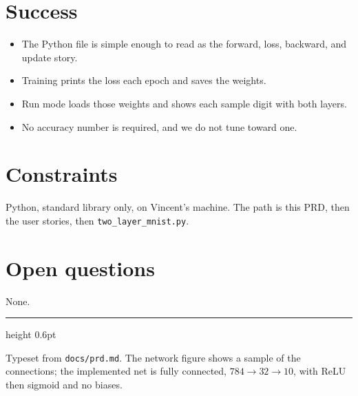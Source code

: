 \documentclass[11pt]{article}
\begin{document}
\section*{Success}

\begin{itemize}
  \item The Python file is simple enough to read as the forward, loss, backward, and update story.
  \item Training prints the loss each epoch and saves the weights.
  \item Run mode loads those weights and shows each sample digit with both layers.
  \item No accuracy number is required, and we do not tune toward one.
\end{itemize}

\section*{Constraints}

Python, standard library only, on Vincent's machine. The path is this PRD, then the user stories, then \texttt{two\_layer\_mnist.py}.

\section*{Open questions}

None.

\vspace{1.4em}
{\color{line}\hrule height 0.6pt}
\vspace{0.55em}
{\sffamily\scriptsize\color{muted} Typeset from \texttt{docs/prd.md}. The network figure shows a sample of the connections; the implemented net is fully connected, $784\rightarrow 32\rightarrow 10$, with ReLU then sigmoid and no biases.}
\end{document}
